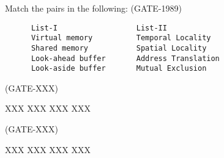 \begin{comment}
                      \begin{lstlisting}     \end{lstlisting}
                      \begin{enumerate}
                          \item[I]
                          \item[II]
                      \end{enumerate}

                        \(  \mathbf{    } \)          {\huge \(    \) }               {\large \( \mathbf {  } \) }

                        p_{n-1}       \sum_{n=1}^{n} s_i     \forall i, s_i

                        \qquad \  \; \:
\end{comment}
\begin{comment}

\end{comment}



\begin{questyle}

  \question Match the pairs in the following: (GATE-1989)

  \begin{lstlisting}
      List-I                  List-II
      Virtual memory          Temporal Locality
      Shared memory           Spatial Locality
      Look-ahead buffer       Address Translation
      Look-aside buffer       Mutual Exclusion

  \end{lstlisting}


\end{questyle}



\begin{questyle}

  \question  (GATE-XXX)

  \begin{choices}
    \choice XXX
    \choice XXX
    \choice XXX
    \choice XXX
  \end{choices}

\end{questyle}



\begin{questyle}

  \question  (GATE-XXX)

  \begin{choices}
    \choice XXX
    \choice XXX
    \choice XXX
    \choice XXX
  \end{choices}

\end{questyle}




